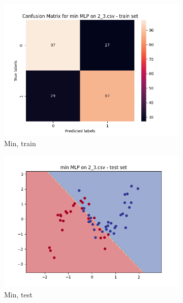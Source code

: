 \documentclass[12pt]{article}
\newcommand*{\subfigwidth}{0.24\textwidth}
\begin{document}
\begin{figure}[H]
\begin{subfigure}[t]{\subfigwidth}
        \includegraphics[width=\linewidth]{img/exp_2/mlp/2_3/min/train_matrix.png}
        \caption{Min, train}
    \end{subfigure}
    \hfill
    \begin{subfigure}[t]{\subfigwidth}
        \includegraphics[width=\linewidth]{img/exp_2/mlp/2_3/min/test_boundary.png}
        \caption{Min, test}
    \end{subfigure}
    \hfill
    \begin{subfigure}[t]{\subfigwidth}

\end{subfigure}
\end{figure}
\end{document}
